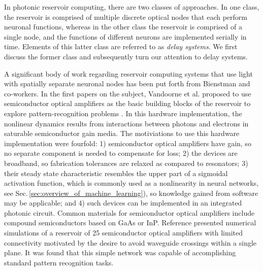 In photonic reservoir computing, there are two classes of approaches. In one class, the reservoir is comprised of multiple discrete optical nodes that each perform neuronal functions, whereas in the other class the reservoir is comprised of a single node, and the functions of different neurons are implemented serially in time. Elements of this latter class are referred to as \textit{delay systems}. We first discuss the former class and subsequently turn our attention to delay systems.

A significant body of work regarding reservoir computing systems that use light with spatially separate neuronal nodes has been put forth from Bienstman and co-workers. In the first papers on the subject, Vandoorne et al. proposed to use semiconductor optical amplifiers as the basic building blocks of the reservoir to explore pattern-recognition problems \cite{vadi2008,vada2011}. In this hardware implementation, the nonlinear dynamics results from interactions between photons and electrons in saturable semiconductor gain media. The motiviations to use this hardware implementation were fourfold: 1) semiconductor optical amplifiers have gain, so no separate component is needed to compensate for loss; 2) the devices are broadband, so fabrication tolerances are relaxed as compared to resonators; 3) their steady state characteristic resembles the upper part of a sigmoidal activation function, which is commonly used as a nonlinearity in neural networks, see Sec.\,\ref{sec:overview_of_machine_learning}), so knowledge gained from software may be applicable; and 4) such devices can be implemented in an integrated photonic circuit. Common materials for semiconductor optical amplifiers include compound semiconductors based on GaAs or InP. Reference  presented numerical simulations of a reservoir of 25 semiconductor optical amplifiers with limited connectivity motivated by the desire to avoid waveguide crossings within a single plane. It was found that this simple network was capable of accomplishing standard pattern recognition tasks. 

